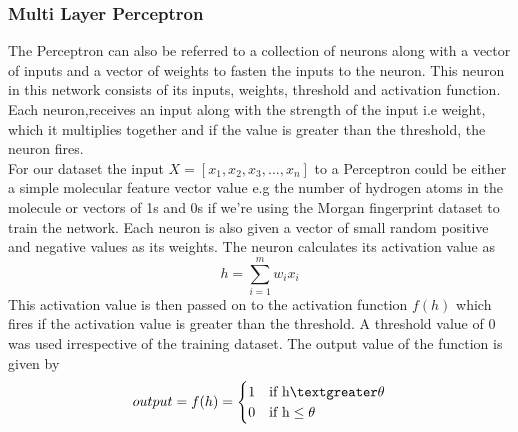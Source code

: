 \documentclass[a4paper,12pt]{report}
\begin{document}
			\subsubsection{Multi Layer Perceptron}
			The Perceptron can also be referred to a collection of neurons along with a vector of inputs and a vector of weights to fasten the inputs to the neuron. This neuron in this network consists of its inputs, weights, threshold and activation function. Each neuron,receives an input along with the strength of the input i.e weight, which it multiplies together and if the value is greater than the threshold, the neuron fires. \\
			For our dataset the input $X = [x_1,x_2,x_3,...,x_n]$ to a Perceptron could be either a simple molecular feature vector value e.g the number of hydrogen atoms in the molecule or vectors of 1s and 0s if we're using the Morgan fingerprint dataset to train the network. Each neuron is also given a vector of small random positive and negative values as its weights. The neuron calculates its activation value as 
			\begin{equation}
				h = \sum_{i=1}^{m}w_ix_i
			\end{equation}
			This activation value is then passed on to the activation function $f(h)$ which fires if the activation value is greater than the threshold. A threshold value of 0 was used irrespective of the training dataset. The output value of the function is given by
			\begin{equation}
				output = f(h) = 
				\begin{cases}
					1 & \text{if h} \textgreater \theta \\
					0 & \text{if h} \le \theta
				\end{cases}
			\end{equation}
\end{document}
